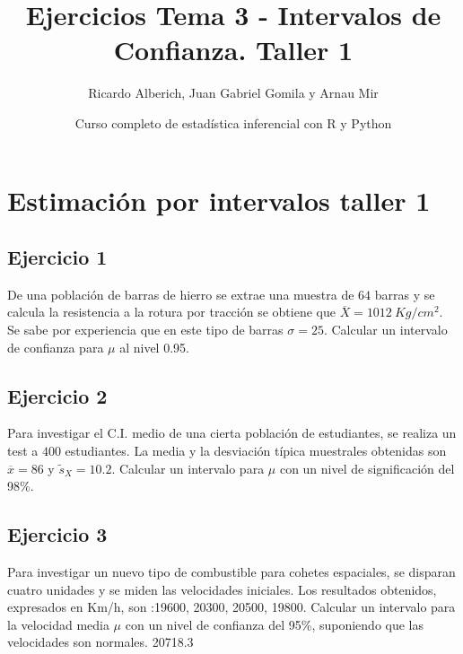 \documentclass[
]{article}
\title{Ejercicios Tema 3 - Intervalos de Confianza. Taller 1}
\author{Ricardo Alberich, Juan Gabriel Gomila y Arnau Mir}
\date{Curso completo de estadística inferencial con R y Python}
\begin{document}
\maketitle

{
\hypersetup{linkcolor=blue}
\setcounter{tocdepth}{2}
\tableofcontents
}
\hypertarget{estimaciuxf3n-por-intervalos-taller-1}{%
\section{Estimación por intervalos taller
1}\label{estimaciuxf3n-por-intervalos-taller-1}}

\hypertarget{ejercicio-1}{%
\subsection{Ejercicio 1}\label{ejercicio-1}}

De una población de barras de hierro se extrae una muestra de \(64\)
barras y se calcula la resistencia a la rotura por tracción se obtiene
que \(\overline{X}=1012\ Kg/cm^{2}\). Se sabe por experiencia que en
este tipo de barras \(\sigma=25\). Calcular un intervalo de confianza
para \(\mu\) al nivel 0.95.


\hypertarget{ejercicio-2}{%
\subsection{Ejercicio 2}\label{ejercicio-2}}

Para investigar el C.I. medio de una cierta población de estudiantes, se
realiza un test a \(400\) estudiantes. La media y la desviación típica
muestrales obtenidas son \(\overline{x}=86\) y \(\tilde{s}_{X}=10.2\).
Calcular un intervalo para \(\mu\) con un nivel de significación del
98\%. 

\hypertarget{ejercicio-3}{%
\subsection{Ejercicio 3}\label{ejercicio-3}}

Para investigar un nuevo tipo de combustible para cohetes espaciales, se
disparan cuatro unidades y se miden las velocidades iniciales. Los
resultados obtenidos, expresados en Km/h, son :19600, 20300, 20500,
19800. Calcular un intervalo para la velocidad media \(\mu\) con un
nivel de confianza del 95\%, suponiendo que las velocidades son
normales.  20718.3
\end{document}
